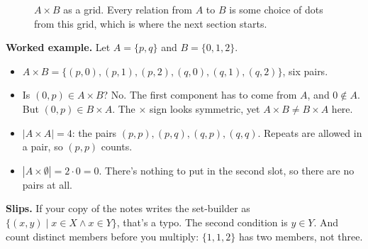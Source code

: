 \begin{figure}[H]
\centering
{}
\caption{$A\times B$ as a grid. Every relation from $A$ to $B$ is some choice of dots from this grid, which is where the next section starts.}
\end{figure}

\textbf{Worked example.} Let $A=\{p,q\}$ and $B=\{0,1,2\}$.
\begin{itemize}
\item $A\times B=\{(p,0),(p,1),(p,2),(q,0),(q,1),(q,2)\}$, six pairs.
\item Is $(0,p)\in A\times B$? No. The first component has to come from $A$, and $0\notin A$. But $(0,p)\in B\times A$. The $\times$ sign looks symmetric, yet $A\times B\neq B\times A$ here.
\item $|A\times A|=4$: the pairs $(p,p),(p,q),(q,p),(q,q)$. Repeats are allowed in a pair, so $(p,p)$ counts.
\item $|A\times\emptyset|=2\cdot 0=0$. There's nothing to put in the second slot, so there are no pairs at all.
\end{itemize}

\textbf{Slips.} If your copy of the notes writes the set-builder as $\{(x,y)\mid x\in X\land x\in Y\}$, that's a typo. The second condition is $y\in Y$. And count distinct members before you multiply: $\{1,1,2\}$ has two members, not three.

